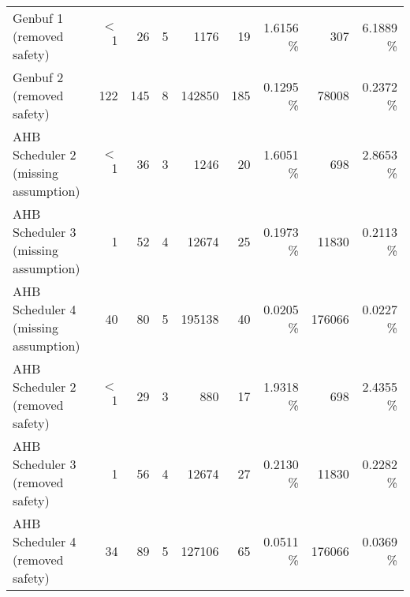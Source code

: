 \begin{tabular}{|l|rr|rr|rr|rr|}
  Genbuf 1 (removed safety) & $<$1 & 26 & 5 & 1176 & 19 &  1.6156 \% & 307 &  6.1889 \% \\ 
  Genbuf 2 (removed safety) & 122 & 145 & 8 & 142850 & 185 &  0.1295 \% & 78008 &  0.2372 \% \\ 
  AHB Scheduler 2 (missing assumption) & $<$1 & 36 & 3 & 1246 & 20 &  1.6051 \% & 698 &  2.8653 \% \\ 
  AHB Scheduler 3 (missing assumption) & 1 & 52 & 4 & 12674 & 25 &  0.1973 \% & 11830 &  0.2113 \% \\ 
  AHB Scheduler 4 (missing assumption) & 40 & 80 & 5 & 195138 & 40 &  0.0205 \% & 176066 &  0.0227 \% \\ 
  AHB Scheduler 2 (removed safety) & $<$1 & 29 & 3 & 880 & 17 &  1.9318 \% & 698 &  2.4355 \% \\ 
  AHB Scheduler 3 (removed safety) & 1 & 56 & 4 & 12674 & 27 &  0.2130 \% & 11830 &  0.2282 \% \\ 
  AHB Scheduler 4 (removed safety) & 34 & 89 & 5 & 127106 & 65 &  0.0511 \% & 176066 &  0.0369 \% \\ 
   \hline
\end{tabular}
